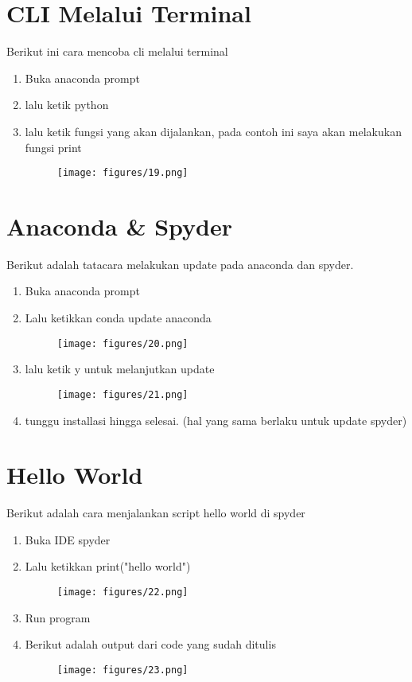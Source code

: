 \section{CLI Melalui Terminal}
Berikut ini cara  mencoba cli melalui terminal 
\begin{enumerate}
\item Buka anaconda prompt
\item lalu ketik python
\item lalu ketik fungsi yang akan dijalankan, pada contoh ini saya akan melakukan fungsi print
\begin{figure}[H]
    \centering
    \texttt{[image: figures/19.png]}
    \label{19}
\end{figure}
\end{enumerate}

\section{Anaconda \& Spyder}
Berikut adalah tatacara melakukan update pada anaconda dan spyder.
\begin{enumerate}
\item Buka anaconda prompt

\item Lalu ketikkan conda update anaconda
\begin{figure}[H]
    \centering
    \texttt{[image: figures/20.png]}
    \label{20}
\end{figure}

\item lalu ketik y untuk melanjutkan update
\begin{figure}[H]
    \centering
    \texttt{[image: figures/21.png]}
    \label{21}
\end{figure}
\item tunggu installasi hingga selesai. (hal yang sama berlaku untuk update spyder)
\end{enumerate}

\section{Hello World}
Berikut adalah cara menjalankan script hello world di spyder
\begin{enumerate}
\item Buka IDE spyder
\item Lalu ketikkan print("hello world")
\begin{figure}[H]
    \centering
    \texttt{[image: figures/22.png]}
    \label{22}
\end{figure}
\item Run program
\item Berikut adalah output dari code yang sudah ditulis
\begin{figure}[H]
    \centering
    \texttt{[image: figures/23.png]}
    \label{23}
\end{figure}
\end{enumerate}	

